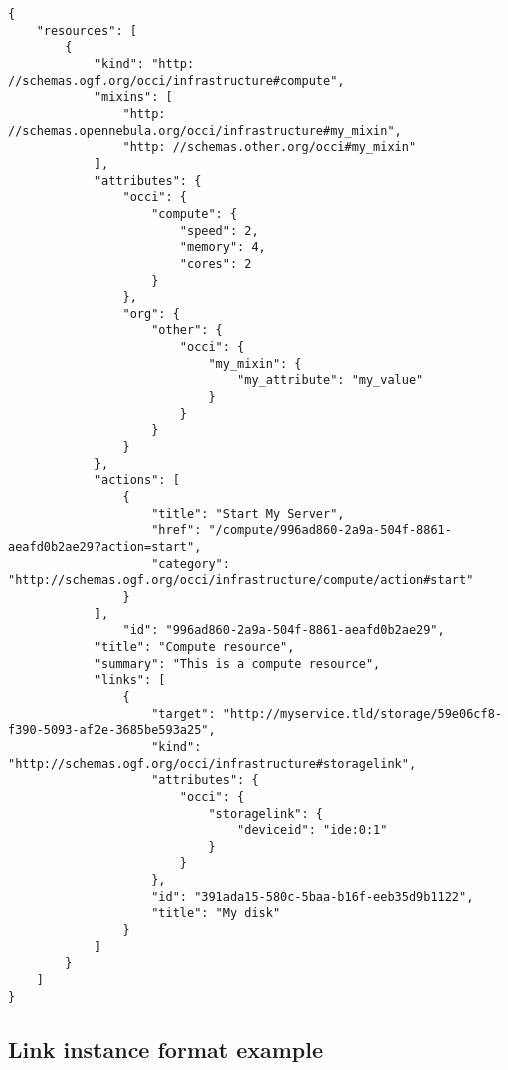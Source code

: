 \documentclass[10pt,a4paper]{article}
\begin{document}
\begin{verbatim}
{
    "resources": [
        {
            "kind": "http: //schemas.ogf.org/occi/infrastructure#compute",
            "mixins": [
                "http: //schemas.opennebula.org/occi/infrastructure#my_mixin",
                "http: //schemas.other.org/occi#my_mixin"
            ],
            "attributes": {
                "occi": {
                    "compute": {
                        "speed": 2,
                        "memory": 4,
                        "cores": 2
                    }
                },
                "org": {
                    "other": {
                        "occi": {
                            "my_mixin": {
                                "my_attribute": "my_value"
                            }
                        }
                    }
                }
            },
            "actions": [
                {
                    "title": "Start My Server",
                    "href": "/compute/996ad860-2a9a-504f-8861-aeafd0b2ae29?action=start",
                    "category": "http://schemas.ogf.org/occi/infrastructure/compute/action#start"
                }
            ],
            	"id": "996ad860-2a9a-504f-8861-aeafd0b2ae29",
		    "title": "Compute resource",
		    "summary": "This is a compute resource",
		    "links": [
		        {
		            "target": "http://myservice.tld/storage/59e06cf8-f390-5093-af2e-3685be593a25",
		            "kind": "http://schemas.ogf.org/occi/infrastructure#storagelink",
		            "attributes": {
		                "occi": {
		                    "storagelink": {
		                        "deviceid": "ide:0:1"
		                    }
		                }
		            },
		            "id": "391ada15-580c-5baa-b16f-eeb35d9b1122",
		            "title": "My disk"
		        }
		    ]
        }
    ]
}
\end{verbatim}

\subsection{Link instance format example}
\label{sec:example_link}
\end{document}
